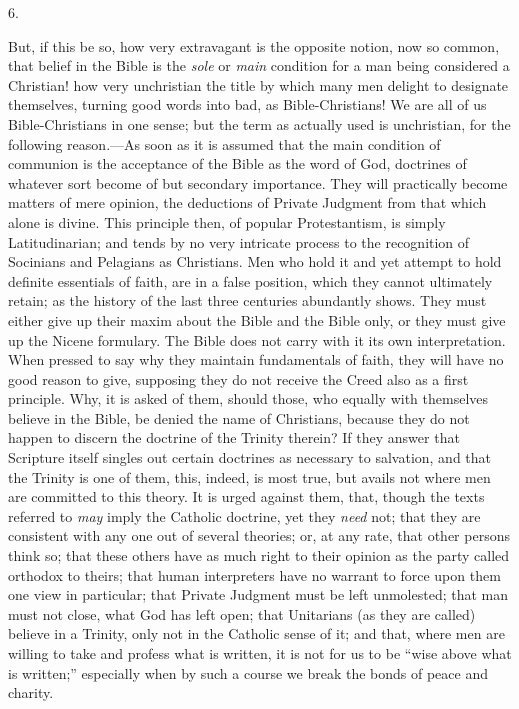 6.

But, if this be so, how very extravagant is the opposite notion,
now so common, that belief in the Bible is the \emph{sole} or \emph{main}
condition for a man being considered a Christian! how very unchristian
the title by which many men delight to designate themselves, turning
good words into bad, as Bible-Christians! We are all of us
Bible-Christians in one sense; but the term as actually used is
unchristian, for the following reason.—As soon as it is assumed that
the main condition of communion is the acceptance of the Bible as the
word of God, doctrines of whatever sort become of but secondary
importance. They will practically become matters of mere opinion, the
deductions of Private Judgment from that which alone is divine. This
principle then, of popular Protestantism, is simply Latitudinarian;
and tends by no very intricate process to the recognition of Socinians
and Pelagians as Christians. Men who hold it and yet attempt to hold
definite essentials of faith, are in a false position, which they
cannot ultimately retain; as the history of the last three centuries
abundantly shows. They must either give up their maxim about the Bible
and the Bible only, or they must give up the Nicene formulary. The
Bible does not carry with it its own interpretation. When pressed to
say why they maintain fundamentals of faith, they will have no good
reason to give, supposing they do not receive the Creed also as a
first principle. Why, it is asked of them, should those, who equally
with themselves believe in the Bible, be denied the name of
Christians, because they do not happen to discern the doctrine of the
Trinity therein? If they answer that Scripture itself singles out
certain doctrines as necessary to salvation, and that the Trinity is
one of them, this, indeed, is most true, but avails not where men are
committed to this theory. It is urged against them, that, though
the texts referred to \emph{may} imply the Catholic doctrine, yet they
\emph{need}
not; that they are consistent with any one out of several theories;
or, at any rate, that other persons think so; that these others have
as much right to their opinion as the party called orthodox to theirs;
that human interpreters have no warrant to force upon them one view in
particular; that Private Judgment must be left unmolested; that man
must not close, what God has left open; that Unitarians (as they are
called) believe in a Trinity, only not in the Catholic sense of it;
and that, where men are willing to take and profess what is written,
it is not for us to be ``wise above what is written;''
especially when by such a course we break the bonds of peace and
charity.


